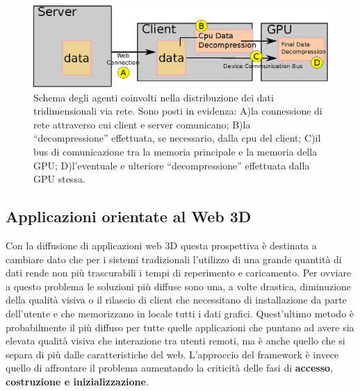 \begin{figure}
\begin{center}
\includegraphics[width=\textwidth]{Immagini/genericdecompressionpipeline}
\caption[Schema agenti della distribuzione dei dati.]{Schema degli agenti coinvolti nella distribuzione dei dati tridimensionali via rete. Sono posti in evidenza: A)la connessione di rete attraverso cui client e server comunicano; B)la ``decompressione'' effettuata, se necessario, dalla cpu del client; C)il bus di comunicazione tra la memoria principale e la memoria della GPU; D)l'eventuale e ulteriore ``decompressione'' effettuata dalla GPU stessa.\label{f:genericdecompressionpipeline}} 
\end{center} 
\end{figure}

\subsection{Applicazioni orientate al Web 3D}
Con la diffusione di applicazioni web 3D questa prospettiva \`e destinata a cambiare dato che per i sistemi tradizionali l'utilizzo di una grande quantit\`a di dati rende non pi\`u trascurabili i tempi di reperimento e caricamento. 
Per ovviare a questo problema le soluzioni pi\`u diffuse sono una, a volte drastica, diminuzione della qualit\`a visiva o il rilascio di client che necessitano di installazione da parte dell'utente e che memorizzano in locale tutti i dati grafici. Quest'ultimo metodo \`e probabilmente il pi\`u diffuso per tutte quelle applicazioni che puntano ad avere sia elevata qualit\`a visiva che interazione tra utenti remoti, ma \`e anche quello che si separa di pi\`u dalle caratteristiche del web.
L'approccio del framework \`e invece quello di affrontare il problema aumentando la criticit\`a delle fasi di \textbf{accesso}, \textbf{costruzione e inizializzazione}.

